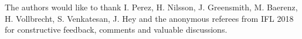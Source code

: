 \documentclass[format=sigconf, review=false, screen=true]{acmart}
\begin{document}














\begin{acks}
The authors would like to thank I. Perez, H. Nilsson, J. Greensmith, M. Baerenz, H. Vollbrecht, S. Venkatesan, J. Hey and the anonymous referees from IFL 2018 for constructive feedback, comments and valuable discussions.
\end{acks}



\end{document}
